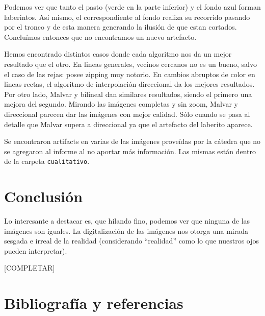 Podemos ver que tanto el pasto (verde en la parte inferior) y el fondo azul forman laberintos. Así mismo, el correspondiente al fondo realiza su recorrido pasando por el tronco y de esta manera generando la ilusión de que estan cortados. Concluímos entonces que no encontramos un nuevo artefacto.

Hemos encontrado distintos casos donde cada algoritmo nos da un mejor resultado que el otro. En lineas generales, vecinos cercanos no es un bueno, salvo el caso de las rejas: posee zipping muy notorio. En cambios abruptos de color en lineas rectas, el algoritmo de interpolación direccional da los mejores resultados. Por otro lado, Malvar y bilineal dan similares resultados, siendo el primero una mejora del segundo. Mirando las imágenes completas y sin zoom, Malvar y direccional parecen dar las imágenes con mejor calidad. Sólo cuando se pasa al detalle que Malvar supera a direccional ya que el artefacto del laberito aparece.

Se encontraron artifacts en varias de las imágenes proveídas por la cátedra que no se agregaron al informe al no aportar más información. Las mismas están dentro de la carpeta \texttt{cualitativo}.


\newpage

\section{Conclusión}

Lo interesante a destacar es, que hilando fino, podemos ver que ninguna de las imágenes son iguales. La digitalización de las imágenes nos otorga una mirada sesgada e irreal de la realidad (considerando ``realidad'' como lo que nuestros ojos pueden interpretar).

[COMPLETAR]
\par
[COMPLETAR]
\par
[COMPLETAR]
\par
[COMPLETAR]

\newpage

\section{Bibliografía y referencias} 

